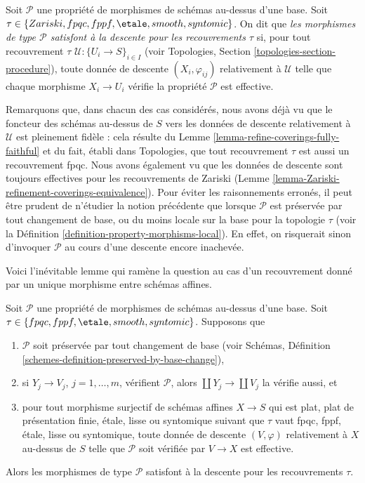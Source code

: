 \begin{definition}
\label{definition-descending-types-morphisms}
Soit $\mathcal{P}$ une propriété de morphismes de schémas au-dessus d'une
base. Soit
$\tau \in \{Zariski, fpqc, fppf, \etale, smooth, syntomic\}$. On dit que
{\it les morphismes de type $\mathcal{P}$ satisfont à la descente pour les
recouvrements $\tau$} si, pour tout recouvrement
$\tau$ $\mathcal{U} : \{U_i \to S\}_{i \in I}$ (voir Topologies,
Section \ref{topologies-section-procedure}), toute donnée de descente
$(X_i, \varphi_{ij})$ relativement à $\mathcal{U}$ telle que chaque morphisme
$X_i \to U_i$ vérifie la propriété $\mathcal{P}$ est effective.
\end{definition}

\noindent
Remarquons que, dans chacun des cas considérés, nous avons déjà vu que le
foncteur des schémas au-dessus de $S$ vers les données de descente relativement
à $\mathcal{U}$ est pleinement fidèle : cela résulte du
Lemme \ref{lemma-refine-coverings-fully-faithful} et du fait, établi dans
Topologies, que tout recouvrement $\tau$ est aussi un recouvrement fpqc. Nous
avons également vu que les données de descente sont toujours effectives pour
les recouvrements de Zariski
(Lemme \ref{lemma-Zariski-refinement-coverings-equivalence}). Pour éviter les
raisonnements erronés, il peut être prudent de n'étudier la notion précédente
que lorsque $\mathcal{P}$ est préservée par tout changement de base, ou du
moins locale sur la base pour la topologie $\tau$ (voir la
Définition \ref{definition-property-morphisms-local}). En effet, on risquerait
sinon d'invoquer $\mathcal{P}$ au cours d'une descente encore inachevée.

\medskip\noindent
Voici l'inévitable lemme qui ramène la question au cas d'un recouvrement donné
par un unique morphisme entre schémas affines.

\begin{lemma}
\label{lemma-descending-types-morphisms}
Soit $\mathcal{P}$ une propriété de morphismes de schémas au-dessus d'une
base. Soit $\tau \in \{fpqc, fppf, \etale, smooth, syntomic\}$. Supposons que
\begin{enumerate}
\item $\mathcal{P}$ soit préservée par tout changement de base (voir Schémas,
Définition \ref{schemes-definition-preserved-by-base-change}),
\item si $Y_j \to V_j$, $j = 1, \ldots, m$, vérifient $\mathcal{P}$, alors
$\coprod Y_j \to \coprod V_j$ la vérifie aussi, et
\item pour tout morphisme surjectif de schémas affines $X \to S$ qui est
plat, plat de présentation finie, \'etale, lisse ou syntomique suivant que
$\tau$ vaut fpqc, fppf, \'etale, lisse ou syntomique, toute donnée de descente
$(V, \varphi)$ relativement à $X$ au-dessus de $S$ telle que $\mathcal{P}$
soit vérifiée par $V \to X$ est effective.
\end{enumerate}
Alors les morphismes de type $\mathcal{P}$ satisfont à la descente pour les
recouvrements $\tau$.
\end{lemma}

